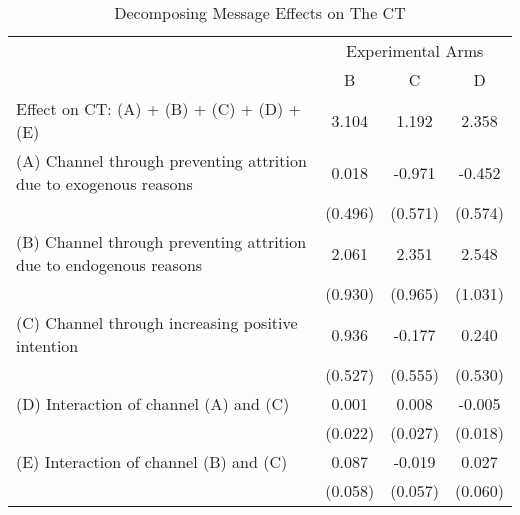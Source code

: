 \documentclass[12pt, a4paper]{article}
\begin{document}
\begin{table}[H]

\caption{\label{tab:decompose-ct}Decomposing Message Effects on The CT}
\centering
\fontsize{8}{10}\selectfont
\begin{threeparttable}
\begin{tabular}[t]{lccc}
\toprule
\multicolumn{1}{c}{ } & \multicolumn{3}{c}{Experimental Arms} \\
\cmidrule(l{3pt}r{3pt}){2-4}
 & B & C & D\\
\midrule
Effect on CT: (A) + (B) + (C) + (D) + (E) & 3.104 & 1.192 & 2.358\\
(A) Channel through preventing attrition due to exogenous reasons & 0.018 & -0.971 & -0.452\\
 & (0.496) & (0.571) & (0.574)\\
(B) Channel through preventing attrition due to endogenous reasons & 2.061 & 2.351 & 2.548\\
 & (0.930) & (0.965) & (1.031)\\
(C) Channel through increasing positive intention & 0.936 & -0.177 & 0.240\\
 & (0.527) & (0.555) & (0.530)\\
(D) Interaction of channel (A) and (C) & 0.001 & 0.008 & -0.005\\
 & (0.022) & (0.027) & (0.018)\\
(E) Interaction of channel (B) and (C) & 0.087 & -0.019 & 0.027\\
 & (0.058) & (0.057) & (0.060)\\
\bottomrule
\end{tabular}
\begin{tablenotes}
\item 
\end{tablenotes}
\end{threeparttable}
\end{table}
\end{document}
